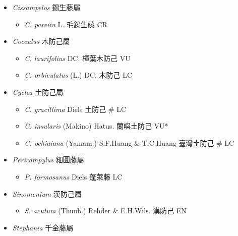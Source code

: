 
  \begin{itemize}
 \item[] \textit{Cissampelos} 錫生藤屬 
                                
  \begin{itemize}
        \item[] \textit{C. pareira} L.  毛錫生藤   CR
  \end{itemize}
 \item[] \textit{Cocculus} 木防己屬
                                
  \begin{itemize}
        \item[] \textit{C. laurifolius} DC.  樟葉木防己   VU
        \item[] \textit{C. orbiculatus} (L.) DC.  木防己   LC
  \end{itemize}
 \item[] \textit{Cyclea} 土防己屬
                                
  \begin{itemize}
        \item[] \textit{C. gracillima} Diels  土防己  \# LC
        \item[] \textit{C. insularis} (Makino) Hatus.  蘭嶼土防己   VU*
        \item[] \textit{C. ochiaiana} (Yamam.) S.F.Huang \& T.C.Huang  臺灣土防己  \# LC
  \end{itemize}
 \item[] \textit{Pericampylus} 細圓藤屬
                                
  \begin{itemize}
        \item[] \textit{P. formosanus} Diels  蓬萊藤   LC
  \end{itemize}
 \item[] \textit{Sinomenium} 漢防己屬
                                
  \begin{itemize}
        \item[] \textit{S. acutum} (Thunb.) Rehder \& E.H.Wils.  漢防己   EN
  \end{itemize}
 \item[] \textit{Stephania} 千金藤屬
                                

\end{itemize}
